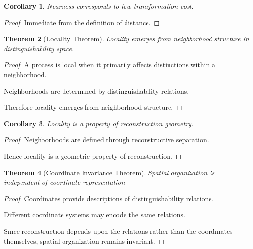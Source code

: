 \documentclass[12pt,oneside]{article}
\newtheorem{theorem}{Theorem}[section] \newtheorem{lemma}[theorem]{Lemma} \newtheorem{proposition}[theorem]{Proposition} \newtheorem{corollary}[theorem]{Corollary}
\theoremstyle{definition}
\begin{document}
\begin{corollary}

Nearness corresponds to low transformation cost.

\end{corollary}

\begin{proof}

Immediate from the definition of distance.

\end{proof}

\begin{theorem}[Locality Theorem]

Locality emerges from neighborhood structure in distinguishability space.

\end{theorem}

\begin{proof}

A process is local when it primarily affects distinctions within a neighborhood.

Neighborhoods are determined by distinguishability relations.

Therefore locality emerges from neighborhood structure.

\end{proof}

\begin{corollary}

Locality is a property of reconstruction geometry.

\end{corollary}

\begin{proof}

Neighborhoods are defined through reconstructive separation.

Hence locality is a geometric property of reconstruction.

\end{proof}

\begin{theorem}[Coordinate Invariance Theorem]

Spatial organization is independent of coordinate representation.

\end{theorem}

\begin{proof}

Coordinates provide descriptions of distinguishability relations.

Different coordinate systems may encode the same relations.

Since reconstruction depends upon the relations rather than the coordinates themselves, spatial organization remains invariant.

\end{proof}
\end{document}
